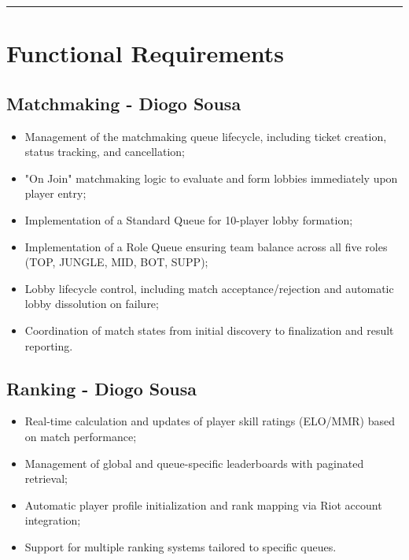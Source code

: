 \documentclass[11pt,a4paper]{article}
\begin{document}
 \vspace{1cm}
 \hrule
 \vspace{1cm}

 \section{Functional Requirements}

 \subsection{Matchmaking - Diogo Sousa}

 \begin{itemize}
  \item Management of the matchmaking queue lifecycle, including ticket creation, status tracking, and cancellation;
  \item "On Join" matchmaking logic to evaluate and form lobbies immediately upon player entry;
  \item Implementation of a Standard Queue for 10-player lobby formation;
  \item Implementation of a Role Queue ensuring team balance across all five roles (TOP, JUNGLE, MID, BOT, SUPP);
  \item Lobby lifecycle control, including match acceptance/rejection and automatic lobby dissolution on failure;
  \item Coordination of match states from initial discovery to finalization and result reporting.
 \end{itemize}

 \subsection{Ranking - Diogo Sousa}

 \begin{itemize}
  \item Real-time calculation and updates of player skill ratings (ELO/MMR) based on match performance;
  \item Management of global and queue-specific leaderboards with paginated retrieval;
  \item Automatic player profile initialization and rank mapping via Riot account integration;
  \item Support for multiple ranking systems tailored to specific queues.
 \end{itemize}
\end{document}
